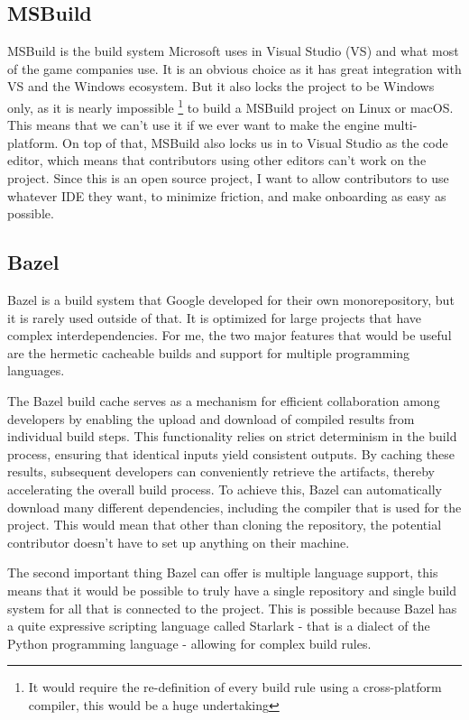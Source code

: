 \subsection{MSBuild}
MSBuild\cite{msbuild} is the build system Microsoft uses in Visual Studio (VS) and what most of the game companies use.
It is an obvious choice as it has great integration with VS and the Windows ecosystem. But it also locks the project to be Windows only, as it is nearly impossible \footnote{It would require the re-definition of every build rule using a cross-platform compiler, this would be a huge undertaking} to build a MSBuild \Cpp project on Linux or macOS. This means that we can't use it if we ever want to make the engine multi-platform. On top of that, MSBuild also locks us in to Visual Studio as the code editor, which means that contributors using other editors can't work on the project. Since this is an open source project, I want to allow contributors to use whatever IDE they want, to minimize friction, and make onboarding as easy as possible.

\subsection{Bazel}
Bazel\cite{bazel} is a build system that Google developed for their own monorepository, but it is rarely used outside of that. It is optimized for large projects that have complex interdependencies. For me, the two major features that would be useful are the hermetic cacheable builds and support for multiple programming languages.

The Bazel build cache serves as a mechanism for efficient collaboration among developers by enabling the upload and download of compiled results from individual build steps. This functionality relies on strict determinism in the build process, ensuring that identical inputs yield consistent outputs. By caching these results, subsequent developers can conveniently retrieve the artifacts, thereby accelerating the overall build process. To achieve this, Bazel can automatically download many different dependencies, including the compiler that is used for the project. This would mean that other than cloning the repository, the potential contributor doesn't have to set up anything on their machine.

The second important thing Bazel can offer is multiple language support, this means that it would be possible to truly have a single repository and single build system for all that is connected to the project. This is possible because Bazel has a quite expressive scripting language called Starlark \cite{starlark} - that is a dialect of the Python programming language - allowing for complex build rules.

